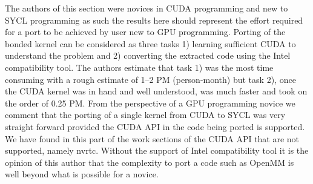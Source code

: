 \documentclass[../main]{subfiles}
\begin{document}
The authors of this section were novices in CUDA programming and new to SYCL programming as such the results here should represent the effort required for a port to be achieved by user new to GPU programming.
Porting of the bonded kernel can be considered as three tasks 1) learning sufficient CUDA to understand the problem and 2) converting the extracted code using the Intel compatibility tool.
The authors estimate that task 1) was the most time consuming with a rough estimate of 1--2 PM (person-month) but task 2), once the CUDA kernel was in hand and well understood, was much faster and took on the order of 0.25 PM.
From the perspective of a GPU programming novice we comment that the porting of a single kernel from CUDA to SYCL was very straight forward provided the CUDA API in the code being ported is supported.
We have found in this part of the work sections of the CUDA API that are not supported, namely nvrtc.
Without the support of Intel compatibility tool it is the opinion of this author that the complexity to port a code such as OpenMM is well beyond what is possible for a novice.
\end{document}
